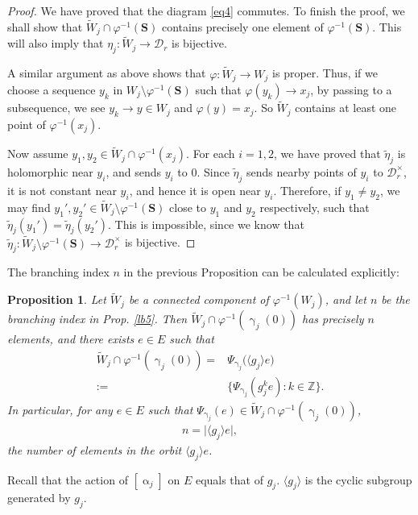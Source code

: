 \documentclass[12pt,a4paper,notitlepage]{article}
\theoremstyle{definition}
\theoremstyle{plain}
\newtheorem{pp}[df]{Proposition}
\newcommand{\mc}{\mathcal}
\newcommand{\wtd}{\widetilde}
\newcommand{\bk}[1]{\langle {#1}\rangle}
\newcommand{\Zbb}{\mathbb Z}
\newcommand{\Sbf}{\mathbf{S}}
\numberwithin{equation}{subsection}
\begin{document}
\begin{proof}
We have proved that the diagram \eqref{eq4} commutes. To finish the proof, we shall show that $\wtd W_j\cap\varphi^{-1}(\Sbf)$ contains precisely one element of $\varphi^{-1}(\Sbf)$. This will also imply that $\eta_j:\wtd W_j\rightarrow\mc D_r$ is bijective.


A similar argument as above shows that $\varphi:\wtd W_j\rightarrow W_j$ is proper. Thus, if we choose a sequence $y_k$ in $W_j\setminus\varphi^{-1}(\Sbf)$ such that $\varphi(y_k)\rightarrow x_j$, by passing to a subsequence, we see $y_k\rightarrow y\in W_j$ and $\varphi(y)=x_j$. So $\wtd W_j$ contains at least one point of $\varphi^{-1}(x_j)$.



Now assume $y_1,y_2\in\wtd W_j\cap\varphi^{-1}(x_j)$. For each $i=1,2$, we have proved that $\wtd\eta_j$ is holomorphic near $y_i$, and sends $y_i$ to $0$. Since $\wtd\eta_j$ sends nearby points of $y_i$ to $\mc D_r^\times$, it is not constant near $y_i$, and hence it is open near $y_i$.  Therefore, if $y_1\neq y_2$, we may find $y_1',y_2'\in\wtd W_j\setminus\varphi^{-1}(\Sbf)$ close to $y_1$ and $y_2$ respectively, such that $\wtd\eta_j(y_1')=\wtd\eta_j(y_2')$. This is impossible, since we know that $\wtd\eta_j:\wtd W_j\setminus\varphi^{-1}(\Sbf)\rightarrow\mc D_r^\times$ is bijective.
\end{proof}


The branching index $n$ in the previous Proposition can be calculated explicitly:

\begin{pp}\label{lb12}
Let $\wtd W_j$ be a connected component of $\varphi^{-1}(W_j)$, and let $n$ be the branching index in Prop. \ref{lb5}.  Then $\wtd W_j\cap\varphi^{-1}(\upgamma_j(0))$ has precisely $n$ elements, and there exists $e\in E$ such that
\begin{align*}
\wtd W_j\cap\varphi^{-1}(\upgamma_j(0))=&\Psi_{\upgamma_j}\big(\bk{g_j}e\big)\\
:=&\Big\{\Psi_{\upgamma_j}(g_j^ke):k\in\Zbb\Big\}.	
\end{align*}
In particular,  for any $e\in E$ such that $\Psi_{\upgamma_j}(e)\in \wtd W_j\cap\varphi^{-1}(\upgamma_j(0))$, 
\begin{align*}
n=\big|\bk{g_j}e\big|,	
\end{align*}
the number of elements in the orbit $\bk{g_j}e$.
\end{pp}

Recall that the action of $[\upalpha_j]$ on $E$ equals that of $g_j$. $\bk{g_j}$ is the cyclic subgroup generated by $g_j$.
\end{document}
